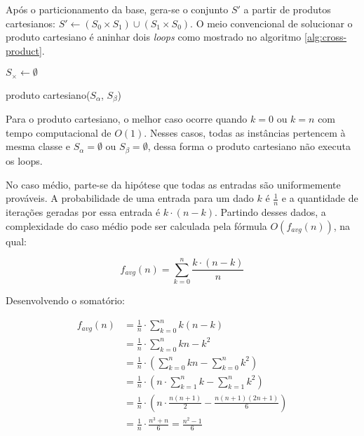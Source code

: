 Após o particionamento da base, gera-se o conjunto $S'$ a partir de produtos cartesianos: $S' \gets (S_0 \times S_1) \cup (S_1 \times S_0)$. O meio convencional de solucionar o produto cartesiano é aninhar dois \emph{loops} como mostrado no algoritmo \ref{alg:cross-product}.

\begin{function}

    $S_{\times} \gets \emptyset$



    \caption{produto cartesiano($S_{\alpha}$, $S_{\beta}$)}
    \label{alg:cross-product}
\end{function}

Para o produto cartesiano, o melhor caso ocorre quando $k = 0$ ou $k = n$ com tempo computacional de $O(1)$. Nesses casos, todas as instâncias pertencem à mesma classe e $S_{\alpha} = \emptyset$ ou $S_{\beta} = \emptyset$, dessa forma o produto cartesiano não executa os loops.

No caso médio, parte-se da hipótese que todas as entradas são uniformemente prováveis. A probabilidade de uma entrada para um dado $k$ é $\frac{1}{n}$ e a quantidade de iterações geradas por essa entrada é $k \cdot (n - k)$. Partindo desses dados, a complexidade do caso médio pode ser calculada pela fórmula $O(f_{avg}(n))$, na qual:

\[f_{avg}(n) = \sum_{k = 0}^{n} \frac{k \cdot (n - k)}{n}\]

Desenvolvendo o somatório:

\begin{align*}
    f_{avg}(n) &= \frac{1}{n} \cdot \sum_{k = 0}^{n} k(n - k) \\
               &= \frac{1}{n} \cdot \sum_{k = 0}^{n} kn - k^2 \\
               &= \frac{1}{n} \cdot \left(\sum_{k = 0}^{n} kn - \sum_{k = 0}^{n} k^2\right) \\
               &= \frac{1}{n} \cdot \left(n \cdot \sum_{k = 1}^{n} k - \sum_{k = 1}^{n} k^2\right) \\
               &= \frac{1}{n} \cdot \left(n \cdot \frac{n(n + 1)}{2} - \frac{n(n + 1)(2n + 1)}{6}\right) \\
               &= \frac{1}{n} \cdot \frac{n^3 + n}{6} = \frac{n^2 -1}{6}
\end{align*}

